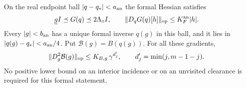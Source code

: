 \begin{lemma}
\label{lem:zf-formal}
On the real endpoint ball $|q-q_*|<a_{\rm an}$ the formal Hessian
satisfies
\begin{equation}\label{eq:zf-hessian}
 \underline g I\preceq G(q)\preceq2\Lambda_\circ I,
 \qquad \|D_qG(q)[h]\|_{\rm op}
                           \le K_F^{\rm an}|h|.
\end{equation}
Every $|g|<b_{\rm an}$ has a unique formal inverse $q(g)$ in this
ball, and it lies in $|q(g)-q_*|<a_{\rm an}/4$.  Put
$\mathcal B(g)=B(q(g))$.  For all these gradients,
\begin{equation}\label{eq:zf-Bg}
 \|D_g^2\mathcal B(g)\|_{\rm op}
             \le K_{B,g}\,\gamma^{d'_j},\qquad
 d'_j=\min(j,m-1-j).
\end{equation}
No positive lower bound on an interior incidence or on an unvisited
clearance is required for this formal statement.
\end{lemma}
